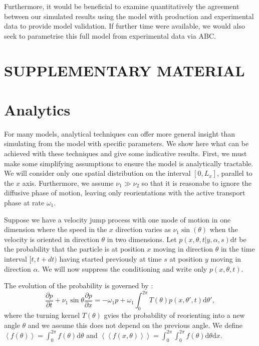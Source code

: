 \documentclass[twocolumn]{biophys}
\def\mean#1{\left< #1 \right>}
\begin{document}
Furthermore, it would be beneficial to examine quantitatively the agreement between our simulated results using the model with production and experimental data to provide model validation.
If further time were available, we would also seek to parametrise this full model from experimental data via ABC. 

\section*{SUPPLEMENTARY MATERIAL}


\vspace{1cm}
{}

\appendix
\section{Analytics}
\normalsize
For many models, analytical techniques can offer more general insight than simulating from the model with specific parameters.
We show here what can be achieved with these techniques and give some indicative results.
First, we must make some simplifying assumptions to ensure the model is analytically tractable. We will consider only one spatial distribution on the interval $[0,L_x]$, parallel to the $x$ axis.
Furthermore, we assume $\nu_1 \gg \nu_2$ so that it is reasonabe to ignore the diffusive phase of motion, leaving only reorientations with the active transport phase at rate $\omega_1$.

Suppose we have a velocity jump process with one mode of motion in one dimension where the speed in the $x$ direction varies as $\nu_1 \sin (\theta)$ when the velocity is oriented in direction $\theta$ in two dimensions.
Let $ p(x,\theta,t | y, \alpha, s)\text{d}t$ be the probability that the particle is at position $x$ moving in direction $\theta$ in the time interval $[t,t+dt)$ having started previously at time $s$ at position $y$ moving in direction $\alpha$.
We will now suppress the conditioning and write only $ p(x,\theta, t) $.

The evolution of the probability is governed \citep{othmer1988models} by :
\begin{equation}\label{Evolution}
 \frac{\partial p}{\partial t} + \nu_1 \sin{\theta } \frac{\partial p}{\partial x} = -\omega_1 p + \omega_1 \int_0^{2\pi} T(\theta) p(x,\theta ', t) \text{d} \theta ',
\end{equation}
where the turning kernel $T(\theta)$ gvies the probability of reorienting into a new angle $\theta$ and we assume this does not depend on the previous angle.
We define $\mean{f(\theta)} = \int_0^{2\pi} f(\theta) \text{d} \theta $ and $\mean{\mean{f(x,\theta)}} =  \int_{0}^{2\pi} \int_0^{2\pi} f(\theta) \text{d} \theta \text{d}  x $.
\end{document}
